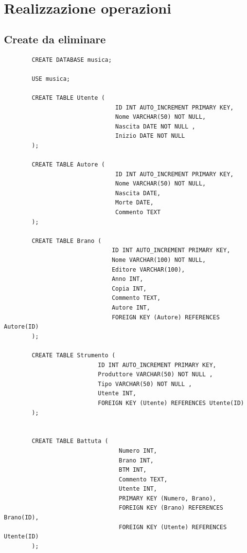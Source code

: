 \documentclass{article}
\begin{document}
    \section{Realizzazione operazioni}

    \subsection{Create da eliminare}

    \begin{verbatim}
        CREATE DATABASE musica;

        USE musica;

        CREATE TABLE Utente (
                                ID INT AUTO_INCREMENT PRIMARY KEY,
                                Nome VARCHAR(50) NOT NULL,
                                Nascita DATE NOT NULL ,
                                Inizio DATE NOT NULL
        );

        CREATE TABLE Autore (
                                ID INT AUTO_INCREMENT PRIMARY KEY,
                                Nome VARCHAR(50) NOT NULL,
                                Nascita DATE,
                                Morte DATE,
                                Commento TEXT
        );

        CREATE TABLE Brano (
                               ID INT AUTO_INCREMENT PRIMARY KEY,
                               Nome VARCHAR(100) NOT NULL,
                               Editore VARCHAR(100),
                               Anno INT,
                               Copia INT,
                               Commento TEXT,
                               Autore INT,
                               FOREIGN KEY (Autore) REFERENCES Autore(ID)
        );

        CREATE TABLE Strumento (
                           ID INT AUTO_INCREMENT PRIMARY KEY,
                           Produttore VARCHAR(50) NOT NULL ,
                           Tipo VARCHAR(50) NOT NULL ,
                           Utente INT,
                           FOREIGN KEY (Utente) REFERENCES Utente(ID)
        );


        CREATE TABLE Battuta (
                                 Numero INT,
                                 Brano INT,
                                 BTM INT,
                                 Commento TEXT,
                                 Utente INT,
                                 PRIMARY KEY (Numero, Brano),
                                 FOREIGN KEY (Brano) REFERENCES Brano(ID),
                                 FOREIGN KEY (Utente) REFERENCES Utente(ID)
        );


\end{verbatim}
\end{document}
